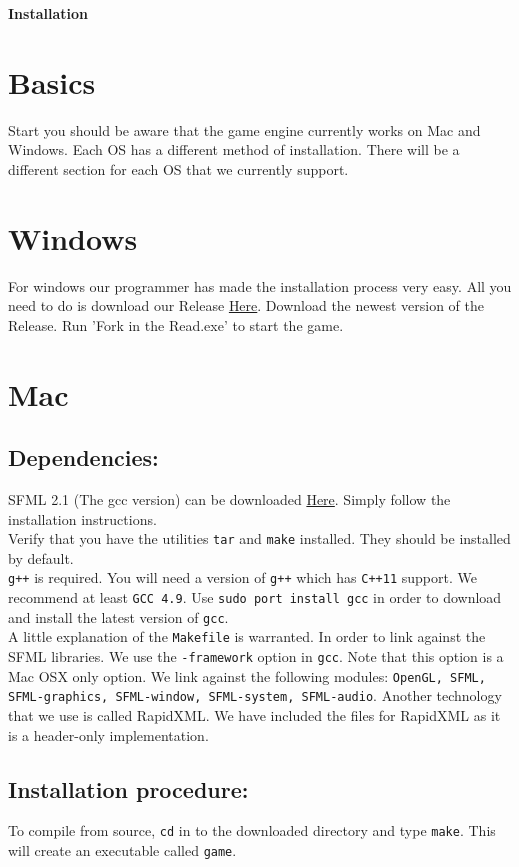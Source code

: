 \documentclass[11pt]{article}
\begin{document}
\begin{center}\huge \bf Installation
\end{center}

\section{Basics}

\indent \indent Start you should be aware that the game engine currently works on Mac and Windows. Each OS has a different method of installation. There will be a different section for each OS that we currently support.

\section{Windows}

\indent \indent  For windows our programmer has made the installation process very easy. All you need to do is download our Release \href{https://github.com/supreme-committee/text-adventure/releases}{Here}. Download the newest version of the Release. Run 'Fork in the Read.exe' to start the game.

\section{Mac}
\subsection{Dependencies:}
    \indent \indent SFML 2.1 (The gcc version) can be downloaded
    \href{http://www.sfml-dev.org/download/sfml/2.1/}{Here}. Simply follow the installation instructions. \\
    \indent Verify that you have the utilities \texttt{tar} and \texttt{make} installed. 
    They should be installed by default. \\
    \indent \texttt{g++} is required. You will need a version of \texttt{g++} which has \texttt{C++11} support.
    We recommend at least \texttt{GCC 4.9}.
    Use \texttt{sudo port install gcc} in order to download and install the 
    latest version of \texttt{gcc}. \\
    \indent A little explanation of the \texttt{Makefile} is warranted. 
    In order to link against the SFML libraries.
    We use the \texttt{-framework} option in \texttt{gcc}. Note that this option is a Mac OSX only option.
    We link against the following modules: 
    \texttt{OpenGL, SFML, SFML-graphics, SFML-window, SFML-system, SFML-audio}.
    Another technology that we use is called RapidXML. We have included the files for RapidXML as it 
    is a header-only implementation.
    
    
\subsection{Installation procedure:}
    \indent \indent To compile from source, \texttt{cd} in to the downloaded directory and type \texttt{make}.
    This will create an executable called \texttt{game}.
    
\end{document}
